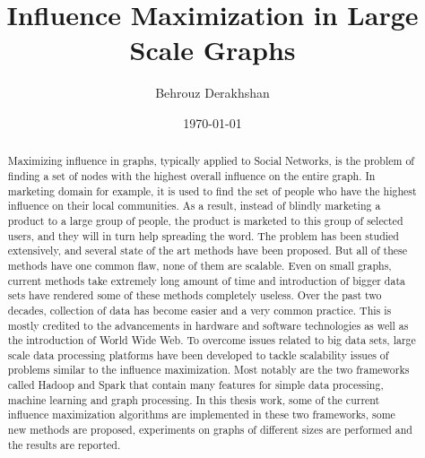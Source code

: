 \documentclass[english]{tktltiki}
\begin{document}
\onehalfspacing

\title{Influence Maximization in Large Scale Graphs}
\author{Behrouz Derakhshan}
\date{\today}

\maketitle



\begin{abstract}

Maximizing influence in graphs, typically applied to Social Networks, is the problem of finding a set of nodes with the highest overall influence on the entire graph. 
In marketing domain for example, it is used to find the set of people who have the highest influence on their local communities. 
As a result, instead of blindly marketing a product to a large group of people, the product is marketed to this group of selected users, and they will in turn help spreading the word. 
The problem has been studied extensively, and several state of the art methods have been proposed.
But all of these methods have one common flaw, none of them are scalable. 
Even on small graphs, current methods take extremely long amount of time and introduction of bigger data sets have rendered some of these methods completely useless. 
Over the past two decades, collection of data has become easier and a very common practice.
This is mostly credited to the advancements in hardware and software technologies as well as the introduction of World Wide Web. 
To overcome issues related to big data sets, large scale data processing platforms have been developed to tackle scalability issues of problems similar to the influence maximization. 
Most notably are the two frameworks called Hadoop and Spark that contain many features for simple data processing, machine learning and graph processing. 
In this thesis work, some of the current influence maximization algorithms are implemented in these two frameworks, some new methods are proposed, experiments on graphs of different sizes are performed and the results are reported. 

\end{abstract}
\end{document}
